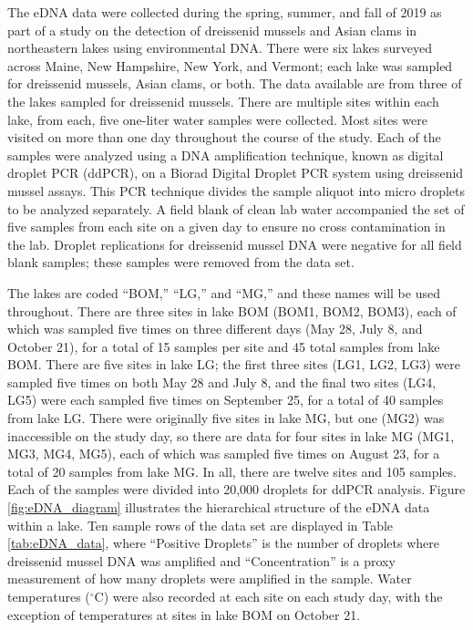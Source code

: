\documentclass[12pt]{article}\usepackage[]{graphicx}\usepackage[]{color}
\begin{document}
The eDNA data were collected during the spring, summer, and fall of 2019 as part of a study on the detection of dreissenid mussels and Asian clams in northeastern lakes using environmental DNA. There were six lakes surveyed across Maine, New Hampshire, New York, and Vermont; each lake was sampled for dreissenid mussels, Asian clams, or both. The data available are from three of the lakes sampled for dreissenid mussels. There are multiple sites within each lake, from each, five one-liter water samples were collected. Most sites were visited on more than one day throughout the course of the study. Each of the samples were analyzed using a DNA amplification technique, known as digital droplet PCR (ddPCR), on a Biorad Digital Droplet PCR system using dreissenid mussel assays. This PCR technique divides the sample aliquot into micro droplets to be analyzed separately. A field blank of clean lab water accompanied the set of five samples from each site on a given day to ensure no cross contamination in the lab. Droplet replications for dreissenid mussel DNA were negative for all field blank samples; these samples were removed from the data set. 

The lakes are coded ``BOM,'' ``LG,'' and ``MG,'' and these names will be used throughout. There are three sites in lake BOM (BOM1, BOM2, BOM3), each of which was sampled five times on three different days (May 28, July 8, and October 21), for a total of 15 samples per site and 45 total samples from lake BOM. There are five sites in lake LG; the first three sites (LG1, LG2, LG3) were sampled five times on both May 28 and July 8, and the final two sites (LG4, LG5) were each sampled five times on September 25, for a total of 40 samples from lake LG. There were originally five sites in lake MG, but one (MG2) was inaccessible on the study day, so there are data for four sites in lake MG (MG1, MG3, MG4, MG5), each of which was sampled five times on August 23, for a total of 20 samples from lake MG. In all, there are twelve sites and 105 samples. Each of the samples were divided into 20,000 droplets for ddPCR analysis. Figure \ref{fig:eDNA_diagram} illustrates the hierarchical structure of the eDNA data within a lake. Ten sample rows of the data set are displayed in Table \ref{tab:eDNA_data}, where ``Positive Droplets'' is the number of droplets where dreissenid mussel DNA was amplified and ``Concentration'' is a proxy measurement of how many droplets were amplified in the sample. Water temperatures ($^\circ$C) were also recorded at each site on each study day, with the exception of temperatures at sites in lake BOM on October 21. 
\end{document}
